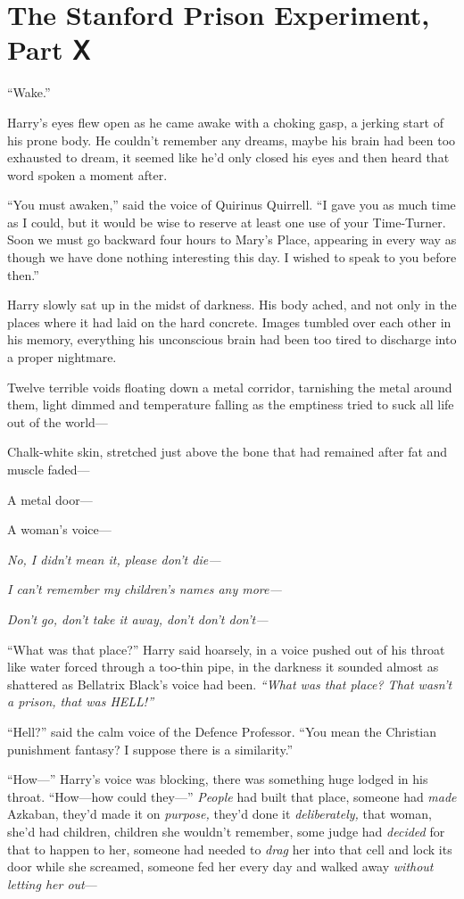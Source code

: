 \chapter{The Stanford Prison Experiment, Part
Ⅹ}\label{the-stanford-prison-experiment-part}

``Wake.''

Harry's eyes flew open as he came awake with a choking gasp, a jerking
start of his prone body. He couldn't remember any dreams, maybe his
brain had been too exhausted to dream, it seemed like he'd only closed
his eyes and then heard that word spoken a moment after.

``You must awaken,'' said the voice of Quirinus Quirrell. ``I gave you
as much time as I could, but it would be wise to reserve at least one
use of your Time-Turner. Soon we must go backward four hours to Mary's
Place, appearing in every way as though we have done nothing interesting
this day. I wished to speak to you before then.''

Harry slowly sat up in the midst of darkness. His body ached, and not
only in the places where it had laid on the hard concrete. Images
tumbled over each other in his memory, everything his unconscious brain
had been too tired to discharge into a proper nightmare.

Twelve terrible voids floating down a metal corridor, tarnishing the
metal around them, light dimmed and temperature falling as the emptiness
tried to suck all life out of the world---

Chalk-white skin, stretched just above the bone that had remained after
fat and muscle faded---

A metal door---

A woman's voice---

\emph{No, I didn't mean it, please don't die---}

\emph{I can't remember my children's names any more---}

\emph{Don't go, don't take it away, don't don't don't---}

``What was that place?'' Harry said hoarsely, in a voice pushed out of
his throat like water forced through a too-thin pipe, in the darkness it
sounded almost as shattered as Bellatrix Black's voice had been.
\emph{``What was that place? That wasn't a prison, that was HELL!''}

``Hell?'' said the calm voice of the Defence Professor. ``You mean the
Christian punishment fantasy? I suppose there is a similarity.''

``How---'' Harry's voice was blocking, there was something huge lodged
in his throat. ``How---how could they---'' \emph{People} had built that
place, someone had \emph{made} Azkaban, they'd made it on
\emph{purpose,} they'd done it \emph{deliberately,} that woman, she'd
had children, children she wouldn't remember, some judge had
\emph{decided} for that to happen to her, someone had needed to
\emph{drag} her into that cell and lock its door while she screamed,
someone fed her every day and walked away \emph{without letting her
out}---

